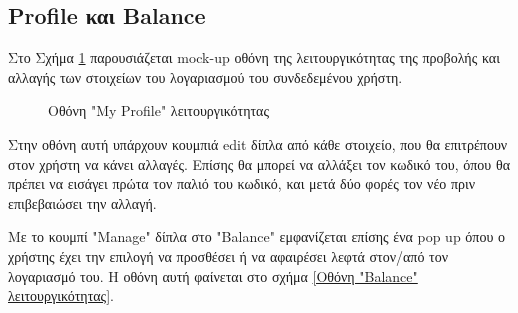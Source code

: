 \documentclass[12pt,a4paper]{article}
\begin{document}
\subsection{Profile και Balance}

Στο Σχήμα \ref{Οθόνη "My Profile" λειτουργικότητας} παρουσιάζεται mock-up οθόνη της λειτουργικότητας της προβολής και αλλαγής των στοιχείων του λογαριασμού του συνδεδεμένου χρήστη.

\begin{figure}[H]
	\caption{Οθόνη "My Profile" λειτουργικότητας}
	\label{Οθόνη "My Profile" λειτουργικότητας}
\end{figure}

Στην οθόνη αυτή υπάρχουν κουμπιά edit δίπλα από κάθε στοιχείο, που θα επιτρέπουν στον χρήστη να κάνει αλλαγές. Επίσης θα μπορεί να αλλάξει τον κωδικό του, όπου θα πρέπει να εισάγει πρώτα τον παλιό του κωδικό, και μετά δύο φορές τον νέο πριν επιβεβαιώσει την αλλαγή. 

Με το κουμπί "Manage" δίπλα στο "Balance" εμφανίζεται επίσης ένα pop up όπου ο χρήστης έχει την επιλογή να προσθέσει ή να αφαιρέσει λεφτά στον/από τον λογαριασμό του. Η οθόνη αυτή φαίνεται στο σχήμα \ref{Οθόνη "Balance" λειτουργικότητας}.
\end{document}
